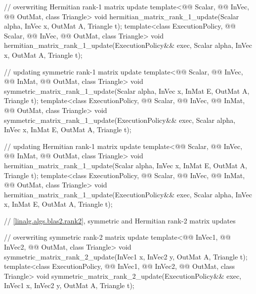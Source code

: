 \begin{codeblock}
{  // overwriting Hermitian rank-1 matrix update
  template<@@ Scalar, @@ InVec, @@ OutMat, class Triangle>
    void hermitian_matrix_rank_1_update(Scalar alpha, InVec x, OutMat A, Triangle t);
  template<class ExecutionPolicy,
           @@ Scalar, @@ InVec, @@ OutMat, class Triangle>
    void hermitian_matrix_rank_1_update(ExecutionPolicy&& exec,
                                        Scalar alpha, InVec x, OutMat A, Triangle t);

  // updating symmetric rank-1 matrix update
  template<@@ Scalar, @@ InVec, @@ InMat, @@ OutMat,
           class Triangle>
    void symmetric_matrix_rank_1_update(Scalar alpha, InVec x, InMat E, OutMat A, Triangle t);
  template<class ExecutionPolicy,
           @@ Scalar, @@ InVec, @@ InMat, @@ OutMat,
           class Triangle>
    void symmetric_matrix_rank_1_update(ExecutionPolicy&& exec,
                                        Scalar alpha, InVec x, InMat E, OutMat A, Triangle t);

  // updating Hermitian rank-1 matrix update
  template<@@ Scalar, @@ InVec, @@ InMat, @@ OutMat,
           class Triangle>
    void hermitian_matrix_rank_1_update(Scalar alpha, InVec x, InMat E, OutMat A, Triangle t);
  template<class ExecutionPolicy,
           @@ Scalar, @@ InVec, @@ InMat, @@ OutMat,
           class Triangle>
    void hermitian_matrix_rank_1_update(ExecutionPolicy&& exec,
                                        Scalar alpha, InVec x, InMat E, OutMat A, Triangle t);

  // \ref{linalg.algs.blas2.rank2}, symmetric and Hermitian rank-2 matrix updates

  // overwriting symmetric rank-2 matrix update
  template<@@ InVec1, @@ InVec2,
           @@ OutMat, class Triangle>
    void symmetric_matrix_rank_2_update(InVec1 x, InVec2 y, OutMat A, Triangle t);
  template<class ExecutionPolicy, @@ InVec1, @@ InVec2,
           @@ OutMat, class Triangle>
    void symmetric_matrix_rank_2_update(ExecutionPolicy&& exec,
                                        InVec1 x, InVec2 y, OutMat A, Triangle t);

}
\end{codeblock}
